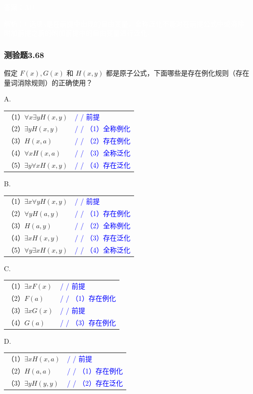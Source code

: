 \documentclass[UTF8, heading=true]{ctexart}
\begin{document}
\textcolor{white}{答案：AB}

\textcolor{white}{解析：C选项$y$是在前提中出现的自由变量，全称泛化不能对在前提公式中或消除附加前提之前的附加前提中的自由变量进行泛化。}

\subsubsection{测验题3.68}

假定 $F(x), G(x)$ 和 $H(x, y)$ 都是原子公式，下面哪些是存在例化规则（存在量词消除规则）的正确使用？


A.

\begin{tabular}{ll}
  （1）$\forall x \exists y H(x, y)$ & \textcolor{blue}{/ / 前提} \\
  （2）$\exists y H(x, y)$ & \textcolor{blue}{/ / （1）全称例化} \\
  （3）$H(x, a)$ & \textcolor{blue}{/ / （2）存在例化} \\
  （4）$\forall x H(x, a)$ & \textcolor{blue}{/ / （3）全称泛化} \\
  （5）$\exists y \forall x H(x, y)$ & \textcolor{blue}{/ / （4）存在泛化}
\end{tabular}

B.

\begin{tabular}{ll}
  （1）$\exists x \forall y H(x, y)$ & \textcolor{blue}{/ / 前提} \\
  （2）$\forall y H(a, y)$ & \textcolor{blue}{/ / （1）存在例化} \\
  （3）$H(a, y)$ & \textcolor{blue}{/ / （2）全称例化} \\
  （4）$\exists x H(x, y)$ & \textcolor{blue}{/ / （3）存在泛化} \\
  （5）$\forall y \exists x H(x, y)$ & \textcolor{blue}{/ / （4）全称泛化}
\end{tabular}

C.

\begin{tabular}{ll}
  （1）$\exists x F(x)$ & \textcolor{blue}{/ / 前提} \\
  （2）$F(a)$ & \textcolor{blue}{/ / （1）存在例化} \\
  （3）$\exists x G(x)$ & \textcolor{blue}{/ / 前提} \\
  （4）$G(a)$ & \textcolor{blue}{/ / （3）存在例化}
\end{tabular}

D.

\begin{tabular}{ll}
  （1）$\exists x H(x, a)$ & \textcolor{blue}{/ / 前提} \\
  （2）$H(a, a)$ & \textcolor{blue}{/ / （1）存在例化} \\
  （3）$\exists y H(y, y)$ & \textcolor{blue}{/ / （2）存在泛化}
\end{tabular}
\end{document}
